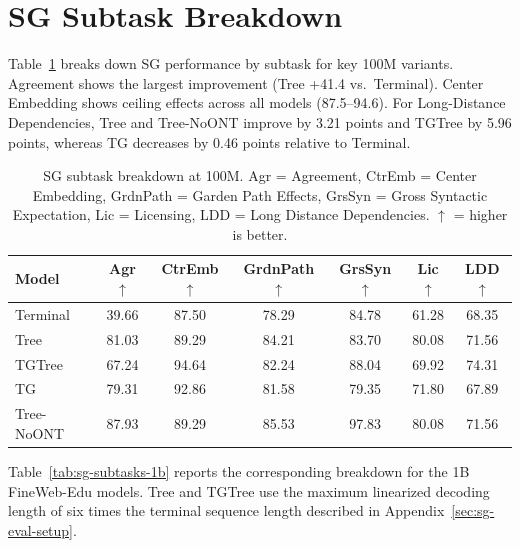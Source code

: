 \documentclass[11pt]{article}
\begin{document}
\section{SG Subtask Breakdown}

Table~\ref{tab:sg-subtasks} breaks down SG performance by subtask for key 100M variants. Agreement shows the largest improvement (Tree +41.4 vs.\ Terminal). Center Embedding shows ceiling effects across all models (87.5--94.6). For Long-Distance Dependencies, Tree and Tree-NoONT improve by 3.21 points and TGTree by 5.96 points, whereas TG decreases by 0.46 points relative to Terminal.

\begin{table}[p]
  \centering
  \small
  \renewcommand{\arraystretch}{1.08}
  \setlength{\tabcolsep}{12pt}
  \begin{tabular}{lcccccc}
    \toprule
    Model & Agr$\uparrow$ & CtrEmb$\uparrow$ & GrdnPath$\uparrow$ & GrsSyn$\uparrow$ & Lic$\uparrow$ & LDD$\uparrow$ \\
    \midrule
    Terminal & 39.66 & 87.50 & 78.29 & 84.78 & 61.28 & 68.35 \\
    Tree & 81.03 & 89.29 & 84.21 & 83.70 & 80.08 & 71.56 \\
    TGTree & 67.24 & 94.64 & 82.24 & 88.04 & 69.92 & 74.31 \\
    TG & 79.31 & 92.86 & 81.58 & 79.35 & 71.80 & 67.89 \\
    Tree-NoONT & 87.93 & 89.29 & 85.53 & 97.83 & 80.08 & 71.56 \\
    \bottomrule
  \end{tabular}
  \caption{SG subtask breakdown at 100M. Agr = Agreement, CtrEmb = Center Embedding, GrdnPath = Garden Path Effects, GrsSyn = Gross Syntactic Expectation, Lic = Licensing, LDD = Long Distance Dependencies. $\uparrow$ = higher is better.}
  \label{tab:sg-subtasks}
\end{table}

Table~\ref{tab:sg-subtasks-1b} reports the corresponding breakdown for the 1B FineWeb-Edu models. Tree and TGTree use the maximum linearized decoding length of six times the terminal sequence length described in Appendix~\ref{sec:sg-eval-setup}.
\end{document}
